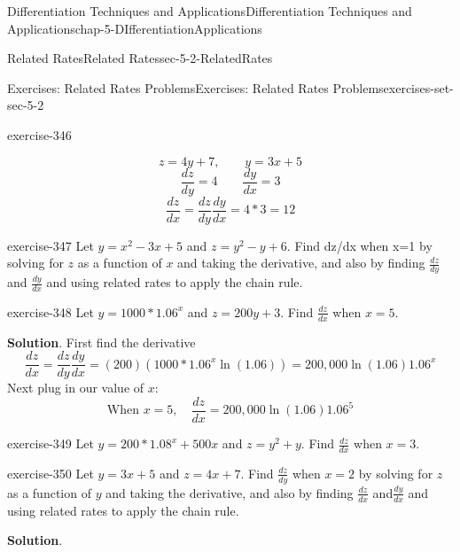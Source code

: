 \documentclass[oneside,10pt,]{book}
\numberwithin{equation}{section}
\begin{document}
\begin{chapterptx}{Differentiation Techniques and Applications}{}{Differentiation Techniques and Applications}{}{}{chap-5-DIfferentiationApplications}
\begin{sectionptx}{Related Rates}{}{Related Rates}{}{}{sec-5-2-RelatedRates}
\begin{exercises-subsection-numberless}{Exercises: Related Rates Problems}{}{Exercises: Related Rates Problems}{}{}{exercises-set-sec-5-2}
\begin{divisionexercise}{1}{}{}{exercise-346}
\begin{itemize}[label=\textbullet]
\begin{equation*}
z=4y+7,\qquad y=3x+5
\end{equation*}
%
\begin{equation*}
\frac{dz}{dy}=4  \qquad \frac{dy}{dx}=3
\end{equation*}
%
\begin{equation*}
\frac{dz}{dx}=\frac{dz}{dy}  \frac{dy}{dx}=4*3=12
\end{equation*}
%
\end{itemize}
\end{divisionexercise}%
\begin{divisionexercise}{2}{}{}{exercise-347}%
\hypertarget{p-1975}{}%
Let \(y=x^2-3x+5\) and \(z=y^2-y+6\). Find dz\slash{}dx when x=1 by solving for \(z\) as a function of \(x\) and taking the derivative, and also by finding \(\frac{dz}{dy}\) and \(\frac{dy}{dx}\) and using related rates to apply the chain rule.%
\end{divisionexercise}%
\begin{divisionexercise}{3}{}{}{exercise-348}%
\hypertarget{p-1976}{}%
Let \(y=1000*1.06^x\) and \(z=200y+3\). Find \(\frac{dz}{dx}\) when \(x=5\).%
\par\smallskip%
\noindent\textbf{Solution}.\hypertarget{solution-175}{}\quad%
\hypertarget{p-1977}{}%
First find the derivative%
%
\begin{equation*}
\frac{dz}{dx}=\frac{dz}{dy}  \frac{dy}{dx}=(200)  (1000*1.06^x  \ln(1.06) )= 200,000 \ln(1.06)  1.06^x
\end{equation*}
\hypertarget{p-1978}{}%
Next plug in our value of \(x\):%
%
\begin{equation*}
\text{When }x=5,\quad    \frac{dz}{dx}= 200,000 \ln(1.06)  1.06^5
\end{equation*}
\end{divisionexercise}%
\begin{divisionexercise}{4}{}{}{exercise-349}%
\hypertarget{p-1979}{}%
Let \(y=200*1.08^x+500x\) and \(z=y^2+y\). Find \(\frac{dz}{dx}\) when \(x= 3\).%
\end{divisionexercise}%
\begin{divisionexercise}{5}{}{}{exercise-350}%
\hypertarget{p-1980}{}%
Let \(y=3x+5\) and \(z=4x+7\). Find \(\frac{dz}{dy}\) when \(x=2\) by solving for \(z\) as a function of \(y\) and taking the derivative, and also by finding \(\frac{dz}{dx}\) and\(\frac{dy}{dx}\) and using related rates to apply the chain rule.%
\par\smallskip%
\noindent\textbf{Solution}.\hypertarget{solution-176}{}\quad%

\end{divisionexercise}
\end{exercises-subsection-numberless}
\end{sectionptx}
\end{chapterptx}
\end{document}
